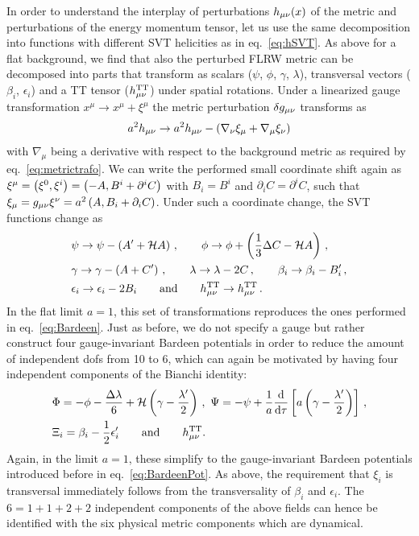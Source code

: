 In order to understand the interplay of perturbations $h_{{\mu \nu}}(x)$ of the metric and perturbations of the energy momentum tensor, let us use the same decomposition into functions with different \ac{SVT} helicities as in eq.~\eqref{eq:hSVT}. As above for a flat background, we find that also the perturbed  \ac{FLRW} metric can be decomposed into  parts that transform as scalars ($\psi$, $\phi$, $\gamma$, $\lambda$), transversal vectors ($\beta_i$, $\epsilon_i$) and a \ac{TT} tensor ($h_{{\mu \nu}}^{\text{TT}}$) under spatial rotations. Under a linearized gauge transformation $x^\mu \rightarrow x^\mu + \xi^\mu$ the metric perturbation $\delta g_{{\mu \nu}}$ transforms as
\begin{align}
	a^2 h_{{\mu \nu}} \rightarrow a^2 h_{{\mu \nu}} - \left( \nabla_\nu \xi_\mu + \nabla_\mu \xi_\nu \right)
\end{align}
with $\nabla_\mu$ being a derivative with respect to the background metric as required by eq.~\eqref{eq:metrictrafo}. We can write the performed small coordinate shift again as $\xi^\mu = \left( \xi^0, \xi^i \right) = \left( -A, B^i + \partial^i C \right)$ with $B_i = B^i$ and  $\partial_i C = \partial^i C$, such that $\xi_\mu = g_{{\mu \nu}} \xi^\nu = a^2 \left( A, B_i + \partial_i C \right)$. Under such a coordinate change, the \ac{SVT} functions change as
\begin{align}
	&\psi \rightarrow \psi - \left( A^\prime + \mathcal{H} A \right) \, , \qquad \phi \rightarrow \phi + \left( \frac{1}{3} \Delta C - \mathcal{H} A \right) \, , \nonumber \\
	&\gamma \rightarrow \gamma - \left( A + C^\prime \right) \, , \qquad \lambda \rightarrow \lambda - 2C \, ,  \qquad \beta_i \rightarrow \beta_i - B_i^\prime \, , \nonumber \\
	& \epsilon_i \rightarrow \epsilon_i - 2 B_i \qquad \text{and} \qquad h_{{\mu \nu}}^{\text{TT}} \rightarrow h_{{\mu \nu}}^{\text{TT}} \, .
\end{align} 
In the flat limit $a = 1$, this set of transformations reproduces the ones performed in eq.~\eqref{eq:Bardeen}. Just as before, we do not specify a gauge but rather construct four gauge-invariant Bardeen potentials in order to reduce the amount of  independent \acp{dof} from 10 to 6, which can again be motivated by having four independent components of the Bianchi identity:
\begin{align}
	&\Phi = - \phi - \frac{ \Delta \lambda}{6} + \mathcal{H}\left( \gamma  - \frac{\lambda^\prime}{2}  \right) \, ,  \  \Psi = - \psi + \frac{1}{a} \frac{\mathrm d }{\mathrm d \tau} \left[ a \left( \gamma - \frac{\lambda^\prime}{2} \right) \right] \, , \nonumber \\ 
	&\Xi_i = \beta_i - \frac{1}{2} \epsilon_i^\prime \qquad \text{and} \qquad h_{{\mu \nu}}^{\text{TT}}. 
\end{align}
Again, in the limit $a = 1$, these simplify to the gauge-invariant Bardeen potentials introduced before in eq.~\eqref{eq:BardeenPot}. As above, the requirement that $\xi_i$ is transversal immediately follows from the transversality of $\beta_i$ and $\epsilon_i$. The $6  = 1 + 1 + 2 + 2$ independent components of the above fields can hence be identified with the six physical metric components which are dynamical.

